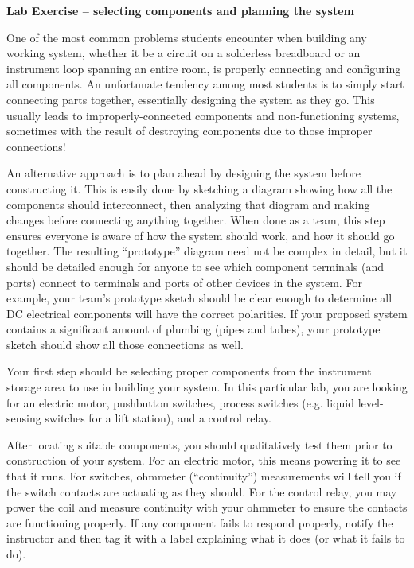 \vfil \eject

\noindent
{\bf Lab Exercise -- selecting components and planning the system}

\vskip 5pt

One of the most common problems students encounter when building any working system, whether it be a circuit on a solderless breadboard or an instrument loop spanning an entire room, is properly connecting and configuring all components.  An unfortunate tendency among most students is to simply start connecting parts together, essentially designing the system as they go.  This usually leads to improperly-connected components and non-functioning systems, sometimes with the result of destroying components due to those improper connections!

An alternative approach is to plan ahead by designing the system before constructing it.  This is easily done by sketching a diagram showing how all the components should interconnect, then analyzing that diagram and making changes before connecting anything together.  When done as a team, this step ensures everyone is aware of how the system should work, and how it should go together.  The resulting ``prototype'' diagram need not be complex in detail, but it should be detailed enough for anyone to see which component terminals (and ports) connect to terminals and ports of other devices in the system.  For example, your team's prototype sketch should be clear enough to determine all DC electrical components will have the correct polarities.  If your proposed system contains a significant amount of plumbing (pipes and tubes), your prototype sketch should show all those connections as well.

\vskip 10pt

Your first step should be selecting proper components from the instrument storage area to use in building your system.  In this particular lab, you are looking for an electric motor, pushbutton switches, process switches (e.g. liquid level-sensing switches for a lift station), and a control relay.

After locating suitable components, you should qualitatively test them prior to construction of your system.  For an electric motor, this means powering it to see that it runs.  For switches, ohmmeter (``continuity'') measurements will tell you if the switch contacts are actuating as they should.  For the control relay, you may power the coil and measure continuity with your ohmmeter to ensure the contacts are functioning properly.  If any component fails to respond properly, notify the instructor and then tag it with a label explaining what it does (or what it fails to do).

